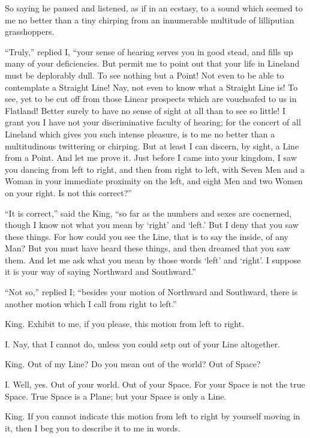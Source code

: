 \documentclass[12pt, a4paper, twoside]{memoir}
\begin{document}
So saying he paused and listened, as if in an ecstasy, to a sound which seemed
to me no better than a tiny chirping from an innumerable multitude of
lilliputian grasshoppers.

``Truly,'' replied I, ``your sense of hearing serves you in good stead, and fills
up many of your deficiencies. But permit me to point out that your life in
Lineland must be deplorably dull. To see nothing but a Point! Not even to be
able to contemplate a Straight Line! Nay, not even to know what a Straight
Line is! To see, yet to be cut off from those Linear prospects which are
vouchsafed to us in Flatland! Better surely to have no sense of sight at all
than to see so little! I grant you I have not your discriminative faculty of
hearing; for the concert of all Lineland which gives you such intense
pleasure, is to me no better than a multitudinous twittering or chirping. But
at least I can discern, by sight, a Line from a Point. And let me prove it.
Just before I came into your kingdom, I saw you dancing from left to right,
and then from right to left, with Seven Men and a Woman in your immediate
proximity on the left, and eight Men and two Women on your right. Is not this
correct?''

``It is correct,'' said the King, ``so far as the numbers and sexes are
cocnerned, though I know not what you mean by `right' and `left.' But I deny
that you saw these things. For how could you see the Line, that is to say the
inside, of any Man? But you must have heard these things, and then dreamed
that you saw them. And let me ask what you mean by those words `left' and
`right'. I suppose it is your way of saying Northward and Southward.''

``Not so,'' replied I; ``besides your motion of Northward and Southward, there is
another motion which I call from right to left.''

King. Exhibit to me, if you please, this motion from left to right.

I. Nay, that I cannot do, unless you could setp out of your Line altogether.

King. Out of my Line? Do you mean out of the world? Out of Space?

I. Well, yes. Out of your world. Out of your Space. For your Space is not the
true Space. True Space is a Plane; but your Space is only a Line.

King. If you cannot indicate this motion from left to right by yourself moving
in it, then I beg you to describe it to me in words.
\end{document}
